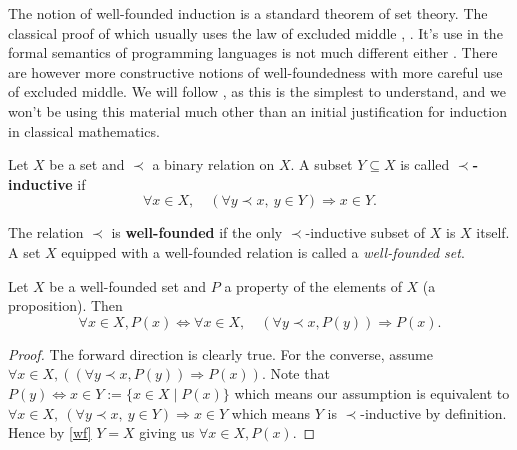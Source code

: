 The notion of well-founded induction is a standard theorem of set theory. The classical proof of which usually uses the law of excluded middle \cite[p. 62]{johnstone1987notes}, \cite[Ch. 7]{barwise1982handbook}. It's use in the formal semantics of programming languages is not much different either \cite[Ch. 3]{winskel1993formal}. There are however more constructive notions of well-foundedness \cite[\S 8]{2018arXiv180805204S} with more careful use of excluded middle. We will follow \cite{10.2307/2275781}, as this is the simplest to understand, and we won't be using this material much other than an initial justification for induction in classical mathematics.

\begin{defin}
    Let $X$ be a set and $\prec$ a binary relation on $X$. A subset $Y \subseteq X$ is called \textbf{$\prec$-inductive} if
    $$
        \forall x \in X, \quad (\forall y \prec x,\ y \in Y) \Rightarrow x \in Y.
    $$
\end{defin}

\begin{defin}\label{wf}
    The relation $\prec$ is \textbf{well-founded} if the only $\prec$-inductive subset of $X$ is $X$ itself. A set $X$ equipped with a well-founded relation is called a \textit{well-founded set}.
\end{defin}

\begin{theorem}
    Let $X$ be a well-founded set and $P$ a property of the elements of $X$ (a proposition). Then
    $$
        \forall x \in X, P(x) \Leftrightarrow \forall x \in X,\quad (\forall y \prec x, P(y)) \Rightarrow P(x).
    $$
\end{theorem}
\begin{proof}
    The forward direction is clearly true. For the converse, assume $\forall x \in X,((\forall y \prec x, P(y)) \Rightarrow P(x))$. Note that $P(y) \Leftrightarrow x \in Y := \{ x \in X \mid P(x)\} $ which means our assumption is equivalent to $\forall x \in X,\ (\forall y \prec x,\ y \in Y) \Rightarrow x \in Y$ which means $Y$ is $\prec$-inductive by definition. Hence by \ref{wf} $Y=X$ giving us $ \forall x \in X, P(x)$.
\end{proof}
